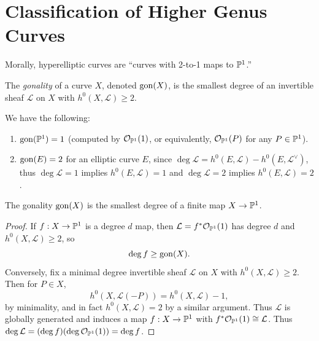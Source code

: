 \section{Classification of Higher Genus Curves}

\begin{remark}
  Morally, hyperelliptic curves are
  ``curves with 2-to-1 maps to $\mathbb{P}^1$.''
\end{remark}

\begin{definition}
  The \emph{gonality} of a curve $X$, denoted
  $\operatorname{gon}(X)$, is the
  smallest degree of an invertible sheaf
  $\mathcal{L}$ on $X$ with
  $h^0(X, \mathcal{L}) \ge 2$.
\end{definition}

\begin{example}
  We have the following:
  \begin{enumerate}
    \item $\operatorname{gon}(\mathbb{P}^1) = 1$ (computed
      by $\mathcal{O}_{\mathbb{P}^1}(1)$, or equivalently,
      $\mathcal{O}_{\mathbb{P}^1}(P)$ for any $P \in \mathbb{P}^1$).
    \item $\operatorname{gon}(E) = 2$ for an
      elliptic curve $E$, since
        $\deg \mathcal{L}
        = h^0(E, \mathcal{L})
        - h^0(E, \mathcal{L}^\vee)$,
        thus $\deg \mathcal{L} = 1$
        implies $h^0(E, \mathcal{L}) = 1$
        and $\deg \mathcal{L} = 2$ implies $h^0(E, \mathcal{L}) = 2$.
  \end{enumerate}
\end{example}

\begin{lemma}
  The gonality $\operatorname{gon}(X)$ is the smallest
  degree of a finite map $X \to \mathbb{P}^1$.
\end{lemma}

\begin{proof}
  If $f : X \to \mathbb{P}^1$ is a degree $d$ map,
  then $\mathcal{L} = f^* \mathcal{O}_{\mathbb{P}^1}(1)$
  has degree $d$ and
  $h^0(X, \mathcal{L}) \ge 2$, so
  \[\deg f \ge \operatorname{gon}(X).\]
  Conversely, fix a minimal degree invertible
  sheaf $\mathcal{L}$ on $X$ with
  $h^0(X, \mathcal{L}) \ge 2$. Then for $P \in X$,
  \[
    h^0(X, \mathcal{L}(-P))
    = h^0(X, \mathcal{L}) - 1,
  \]
  by minimality, and in fact
  $h^0(X, \mathcal{L}) = 2$ by a similar
  argument. Thus
  $\mathcal{L}$ is globally generated and
  induces a map $f : X \to \mathbb{P}^1$
  with $f^* \mathcal{O}_{\mathbb{P}^1}(1) \cong \mathcal{L}$.
  Thus $\deg \mathcal{L} = (\deg f)(\deg \mathcal{O}_{\mathbb{P}^1}(1)) = \deg f$.
\end{proof}


